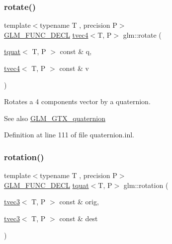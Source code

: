 \subsubsection{\texorpdfstring{rotate()}{rotate()}\hspace{0.1cm}{\footnotesize\ttfamily [2/2]}}
{\footnotesize\ttfamily template$<$typename T , precision P$>$ \\
\mbox{\hyperlink{setup_8hpp_ab2d052de21a70539923e9bcbf6e83a51}{G\+L\+M\+\_\+\+F\+U\+N\+C\+\_\+\+D\+E\+CL}} \mbox{\hyperlink{structglm_1_1tvec4}{tvec4}}$<$T, P$>$ glm\+::rotate (\begin{DoxyParamCaption}\item[{\mbox{\hyperlink{structglm_1_1tquat}{tquat}}$<$ T, P $>$ const \&}]{q,  }\item[{\mbox{\hyperlink{structglm_1_1tvec4}{tvec4}}$<$ T, P $>$ const \&}]{v }\end{DoxyParamCaption})}

Rotates a 4 components vector by a quaternion.

\begin{DoxySeeAlso}{See also}
\mbox{\hyperlink{group__gtx__quaternion}{G\+L\+M\+\_\+\+G\+T\+X\+\_\+quaternion}} 
\end{DoxySeeAlso}


Definition at line 111 of file quaternion.\+inl.

\mbox{\label{group__gtx__quaternion_gac4856d356c5c97cec74e9b672ea89240}} 
\subsubsection{\texorpdfstring{rotation()}{rotation()}}
{\footnotesize\ttfamily template$<$typename T , precision P$>$ \\
\mbox{\hyperlink{setup_8hpp_ab2d052de21a70539923e9bcbf6e83a51}{G\+L\+M\+\_\+\+F\+U\+N\+C\+\_\+\+D\+E\+CL}} \mbox{\hyperlink{structglm_1_1tquat}{tquat}}$<$T, P$>$ glm\+::rotation (\begin{DoxyParamCaption}\item[{\mbox{\hyperlink{structglm_1_1tvec3}{tvec3}}$<$ T, P $>$ const \&}]{orig,  }\item[{\mbox{\hyperlink{structglm_1_1tvec3}{tvec3}}$<$ T, P $>$ const \&}]{dest }\end{DoxyParamCaption})}

